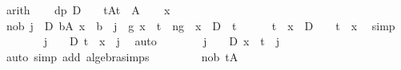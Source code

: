 \begin{isabellebody}
\ arith\isanewline
{}\isamarkupfalse%
\isanewline
\ \ \isamarkupfalse%
\ dp{\isacharcolon}{\kern0pt}\ {\isachardoublequoteopen}D\ {\isachargreater}{\kern0pt}\ {}{\isachardoublequoteclose}\ \ tA{\isacharcolon}{\kern0pt}{\isachardoublequoteopen}t\ {\isasymin}\ A{\isachardoublequoteclose}\isanewline
\ \ \isacommand{{\isacharbraceleft}{\kern0pt}}\isamarkupfalse%
\isamarkupfalse%
\ x\ \isamarkupfalse%
\ nob{\isacharcolon}{\kern0pt}\ {\isachardoublequoteopen}{\isasymforall}j{\isasymin}{\isacharbraceleft}{\kern0pt}{}\ {\isachardot}{\kern0pt}{\isachardot}{\kern0pt}\ D{\isacharbraceright}{\kern0pt}{\isachardot}{\kern0pt}\ {\isasymforall}b{\isasymin}A{\isachardot}{\kern0pt}\ x\ {\isasymnoteq}\ b\ {\isacharminus}{\kern0pt}\ j{\isachardoublequoteclose}\ \ g{\isacharcolon}{\kern0pt}\ {\isachardoublequoteopen}x\ {\isacharless}{\kern0pt}\ t{\isachardoublequoteclose}\ \ ng{\isacharcolon}{\kern0pt}\ {\isachardoublequoteopen}{\isasymnot}\ {\isacharparenleft}{\kern0pt}x\ {\isacharplus}{\kern0pt}\ D{\isacharparenright}{\kern0pt}\ {\isacharless}{\kern0pt}\ t{\isachardoublequoteclose}\isanewline
\ \ \ \ \isamarkupfalse%
\ {\isachardoublequoteopen}t\ {\isacharminus}{\kern0pt}\ x\ {\isasymle}\ D{\isachardoublequoteclose}\ \ {\isachardoublequoteopen}{}\ {\isasymle}\ t\ {\isacharminus}{\kern0pt}\ x{\isachardoublequoteclose}\ \isamarkupfalse%
\ simp{\isacharplus}{\kern0pt}\isanewline
\ \ \ \ \ \ \isamarkupfalse%
\ {\isachardoublequoteopen}{\isasymexists}j\ {\isasymin}\ {\isacharbraceleft}{\kern0pt}{}\ {\isachardot}{\kern0pt}{\isachardot}{\kern0pt}\ D{\isacharbraceright}{\kern0pt}{\isachardot}{\kern0pt}\ t\ {\isacharminus}{\kern0pt}\ x\ {\isacharequal}{\kern0pt}\ j{\isachardoublequoteclose}\ \isamarkupfalse%
\ auto\isanewline
\ \ \ \ \ \ \isamarkupfalse%
\ {\isachardoublequoteopen}{\isasymexists}j\ {\isasymin}\ {\isacharbraceleft}{\kern0pt}{}\ {\isachardot}{\kern0pt}{\isachardot}{\kern0pt}\ D{\isacharbraceright}{\kern0pt}{\isachardot}{\kern0pt}\ x\ {\isacharequal}{\kern0pt}\ t\ {\isacharminus}{\kern0pt}\ j{\isachardoublequoteclose}\ \isamarkupfalse%
\ {\isacharparenleft}{\kern0pt}auto\ simp\ add{\isacharcolon}{\kern0pt}\ algebra{\isacharunderscore}{\kern0pt}simps{\isacharparenright}{\kern0pt}\ \isanewline
\ \ \ \ \ \ \isamarkupfalse%
\ nob\ tA\ \isamarkupfalse%

\end{isabellebody}

